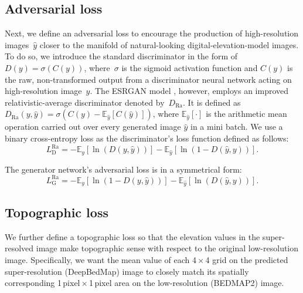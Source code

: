 \documentclass[tc, noline]{copernicus}
\begin{document}
\subsection{Adversarial loss}

Next, we define an adversarial loss to encourage the production of high-resolution images~$\hat{y}$ closer to the manifold of natural-looking digital-elevation-model images. To do so, we introduce the standard discriminator in the form of $D(y) = \sigma(C(y))$, where~$\sigma$ is the sigmoid
activation function and $C(y)$ is the raw, non-transformed output from a discriminator neural network acting on high-resolution image~$y$. The ESRGAN
model \citep{WangESRGANEnhancedSuperResolution2019}, however, employs an improved relativistic-average discriminator
\citep{Jolicoeur-Martineaurelativisticdiscriminatorkey2018} denoted by~$D_{\text{Ra}}$. It is defined as $D_{\text{Ra}}(y,\hat{y}) = \sigma(C(y) -
\mathbb{E}_{\hat{y}}[C(\hat{y})])$, where $\mathbb{E}_{\hat{y}}[\cdot]$ is the arithmetic mean operation carried out over every generated image
$\hat{y}$ in a mini batch. We use a binary cross-entropy loss as the discriminator's loss function defined as follows:
\begin{equation}\label{eq:A2}
L_{\mathrm{D}}^{\text{Ra}} = - \mathbb{E}_y[\ln(D(y,\hat{y}))] - \mathbb{E}_{\hat{y}}[\ln(1 - D(\hat{y},y))].
\end{equation}

The generator network's adversarial loss is in a symmetrical form:
\begin{equation}\label{eq:A3}
L_{\mathrm{G}}^{\text{Ra}} = - \mathbb{E}_y[\ln(1 - D(y,\hat{y}))] - \mathbb{E}_{\hat{y}}[\ln(D(\hat{y},y))].
\end{equation}


\subsection{Topographic loss}

We further define a topographic loss so that the elevation values in the super-resolved image make topographic sense with respect to the original low-resolution image. Specifically, we want the mean value of each 4\,$\times$\,4 grid on the predicted super-resolution (DeepBedMap) image to closely
match its spatially corresponding 1\,\unit{pixel}\,$\times$\,1\,\unit{pixel} area on the low-resolution (BEDMAP2) image.
\end{document}
